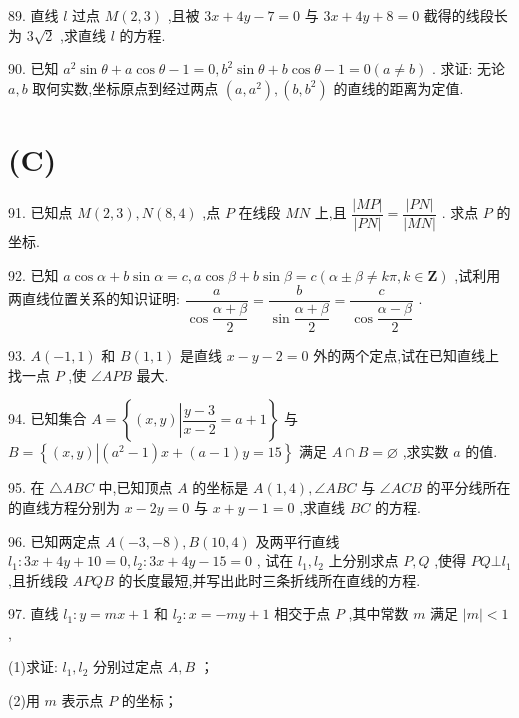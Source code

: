 89. 直线 $l$ 过点 $M\left( {2,3}\right)$ ,且被 ${3x} + {4y} - 7 = 0$ 与 ${3x} + {4y} + 8 = 0$ 截得的线段长为 $3\sqrt{2}$ ,求直线 $l$ 的方程.

90. 已知 ${a}^{2}\sin \theta  + a\cos \theta  - 1 = 0,{b}^{2}\sin \theta  + b\cos \theta  - 1 = 0\left( {a \neq  b}\right)$ . 求证: 无论 $a,b$ 取何实数,坐标原点到经过两点 $\left( {a,{a}^{2}}\right) ,\left( {b,{b}^{2}}\right)$ 的直线的距离为定值.

\section*{(C)}

91. 已知点 $M\left( {2,3}\right) ,N\left( {8,4}\right)$ ,点 $P$ 在线段 ${MN}$ 上,且 $\dfrac{\left| MP\right| }{\left| PN\right| } = \dfrac{\left| PN\right| }{\left| MN\right| }$ . 求点 $P$ 的坐标.

92. 已知 $a\cos \alpha  + b\sin \alpha  = c,a\cos \beta  + b\sin \beta  = c\left( {\alpha  \pm  \beta  \neq  {k\pi },k \in  \mathbf{Z}}\right)$ ,试利用两直线位置关系的知识证明: $\dfrac{a}{\cos \dfrac{\alpha  + \beta }{2}} = \dfrac{b}{\sin \dfrac{\alpha  + \beta }{2}} = \dfrac{c}{\cos \dfrac{\alpha  - \beta }{2}}$ .

93. $A\left( {-1,1}\right)$ 和 $B\left( {1,1}\right)$ 是直线 $x - y - 2 = 0$ 外的两个定点,试在已知直线上找一点 $P$ ,使 $\angle {APB}$ 最大.

94. 已知集合 $A = \left\{  {\left( {x,y}\right) \left| {\dfrac{y - 3}{x - 2} = a + 1}\right. }\right\}$ 与 $B = \left\{  {\left( {x,y}\right) \left| {\left( {{a}^{2} - 1}\right) x + \left( {a - 1}\right) y = {15}}\right. }\right\}$ 满足 $A \cap  B = \varnothing$ ,求实数 $a$ 的值.

95. 在 $\bigtriangleup {ABC}$ 中,已知顶点 $A$ 的坐标是 $A\left( {1,4}\right) ,\angle {ABC}$ 与 $\angle {ACB}$ 的平分线所在的直线方程分别为 $x - {2y} = 0$ 与 $x + y - 1 = 0$ ,求直线 ${BC}$ 的方程.

96. 已知两定点 $A\left( {-3, - 8}\right) ,B\left( {{10},4}\right)$ 及两平行直线 ${l}_{1} : {3x} + {4y} + {10} = 0,{l}_{2} : {3x} + {4y} - {15} = 0$ , 试在 ${l}_{1},{l}_{2}$ 上分别求点 $P,Q$ ,使得 ${PQ} \bot  {l}_{1}$ ,且折线段 ${APQB}$ 的长度最短,并写出此时三条折线所在直线的方程.

97. 直线 ${l}_{1} : y = {mx} + 1$ 和 ${l}_{2} : x =  - {my} + 1$ 相交于点 $P$ ,其中常数 $m$ 满足 $\left| m\right|  < 1$ ,

(1)求证: ${l}_{1},{l}_{2}$ 分别过定点 $A,B$ ；

(2)用 $m$ 表示点 $P$ 的坐标；

